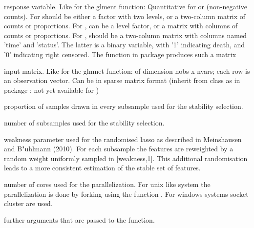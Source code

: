 \documentclass[letterpaper]{book}
\begin{document}
\begin{Arguments}
\begin{ldescription}
\item[\code{y}] 
response variable. Like for the glment function: Quantitative for  or
 (non-negative counts). For
 should be either a factor with two
levels, or a two-column matrix of counts or proportions. For
, can be a  level factor, or a
matrix with  columns of counts or proportions. For
,  should be a two-column matrix with
columns named 'time' and 'status'. The latter is a binary
variable, with '1' indicating death, and '0' indicating right
censored. The function  in package 
produces such a matrix

\item[\code{x}] 
input matrix. Like for the glmnet function:
of dimension nobs x nvars; each row is an
observation vector. Can be in sparse matrix format (inherit
from class  as in package ; not yet
available for )

\item[\code{size}] 
proportion of samples drawn in every subsample used for the stability selection.

\item[\code{steps}] 
number of subsamples used for the stability selection.

\item[\code{weakness}] 
weakness parameter used for the randomised lasso as described in Meinshausen and B\bsl{}"uhlmann (2010). 
For each subsample the features are reweighted by a random weight uniformly sampled in [weakness,1].
This additional randomisation leads to a more consistent estimation of the stable set of features.

\item[\code{mc.cores}] 
number of cores used for the parallelization. For unix like system the parallelization is done by forking using the function . For windows systems socket cluster are used. 

\item[\code{...}] 
further arguments that are passed to the  function. 

\end{ldescription}
\end{Arguments}
%
\end{document}
